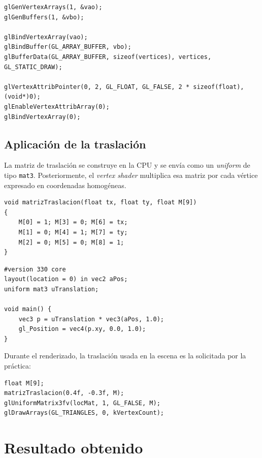 \documentclass[12pt,a4paper]{article}
\begin{document}
\begin{lstlisting}[style=cppstyle,caption={Configuraci\'on del VAO y VBO}]
glGenVertexArrays(1, &vao);
glGenBuffers(1, &vbo);

glBindVertexArray(vao);
glBindBuffer(GL_ARRAY_BUFFER, vbo);
glBufferData(GL_ARRAY_BUFFER, sizeof(vertices), vertices, GL_STATIC_DRAW);

glVertexAttribPointer(0, 2, GL_FLOAT, GL_FALSE, 2 * sizeof(float), (void*)0);
glEnableVertexAttribArray(0);
glBindVertexArray(0);
\end{lstlisting}

\subsection{Aplicaci\'on de la traslaci\'on}

La matriz de traslaci\'on se construye en la CPU y se env\'ia como un \textit{uniform} de tipo \texttt{mat3}. Posteriormente, el \textit{vertex shader} multiplica esa matriz por cada v\'ertice expresado en coordenadas homog\'eneas.

\begin{lstlisting}[style=cppstyle,caption={Construcci\'on de la matriz de traslaci\'on en C++}]
void matrizTraslacion(float tx, float ty, float M[9])
{
	M[0] = 1; M[3] = 0; M[6] = tx;
	M[1] = 0; M[4] = 1; M[7] = ty;
	M[2] = 0; M[5] = 0; M[8] = 1;
}
\end{lstlisting}

\begin{lstlisting}[style=cppstyle,caption={Vertex shader que aplica la traslaci\'on}]
#version 330 core
layout(location = 0) in vec2 aPos;
uniform mat3 uTranslation;

void main() {
	vec3 p = uTranslation * vec3(aPos, 1.0);
	gl_Position = vec4(p.xy, 0.0, 1.0);
}
\end{lstlisting}

Durante el renderizado, la traslaci\'on usada en la escena es la solicitada por la pr\'actica:

\begin{lstlisting}[style=cppstyle,caption={Aplicaci\'on de la traslaci\'on en el ciclo de renderizado}]
float M[9];
matrizTraslacion(0.4f, -0.3f, M);
glUniformMatrix3fv(locMat, 1, GL_FALSE, M);
glDrawArrays(GL_TRIANGLES, 0, kVertexCount);
\end{lstlisting}

\section{Resultado obtenido}
\end{document}
